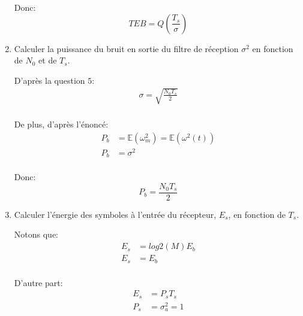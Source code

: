 \documentclass[frenchb]{article}
\begin{document}
\begin{enumerate}
        Donc: 
        $$\boxed{ TEB = Q\left(\frac{T_s}{\sigma} \right)}$$
        \par\leavevmode\par
        \item Calculer la puissance du bruit en sortie du filtre de réception $\sigma^2$ en fonction de $N_0$ et de $T_s$.
        \par\leavevmode\par
        \setlength\parindent{0.5cm}
        D'après la question $5$:
        \begin{equation*}
        \begin{split}
        \sigma = \sqrt{\frac{N_0 T_s}{2}}  \\
        \end{split}
        \end{equation*}
        
        De plus, d'après l'énoncé:
        \begin{equation*}
        \begin{split}
        P_b &= \mathbb{E}(\omega_m^2) = \mathbb{E}(\omega^2(t)) \\
        P_b &= \sigma^2 \\
        \end{split}
        \end{equation*}
        
        Donc:
        $$ \boxed{P_b = \frac{N_0 T_s}{2}}$$
       
        
        \par\leavevmode\par
        \item Calculer l'énergie des symboles à l'entrée du récepteur, $E_s$, en fonction de $T_s$.
        
        Notons que:
        \begin{equation*}
        \begin{split}
        E_s &= log2(M) E_b \\
        E_s & = E_b \\
        \end{split}
        \end{equation*}
        
        D'autre part:
        \begin{equation*}
        \begin{split}
        E_s &= P_s T_s \\
        P_s & = \sigma_a^2 = 1 \\
        \end{split}
        \end{equation*}
        

\end{enumerate}
\end{document}
